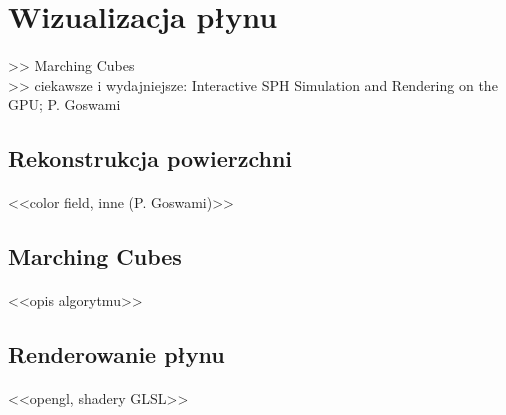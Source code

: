 \newpage

\section{Wizualizacja płynu}

\paragraph{}
{\color{red}>> Marching Cubes\\}
{\color{red}>> ciekawsze i wydajniejsze: Interactive SPH Simulation and Rendering on the GPU; P. Goswami}
\par

\subsection{Rekonstrukcja powierzchni}

\paragraph{}
<<color field, inne (P. Goswami)>>
\par

\subsection{Marching Cubes}

\paragraph{}
<<opis algorytmu>>
\par


\subsection{Renderowanie płynu}

\paragraph{}
<<opengl, shadery GLSL>>
\par